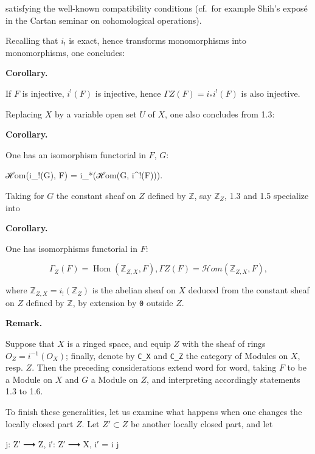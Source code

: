 \documentclass[
]{article}
\newenvironment{Shaded}{}{}
\newcommand{\NormalTok}[1]{#1}
\begin{document}
satisfying the well-known compatibility conditions (cf.~for example
Shih's exposé in the Cartan seminar on cohomological operations).

Recalling that \(i_{!}\) is exact, hence transforms monomorphisms into
monomorphisms, one concludes:

\textbf{Corollary.}

If \(F\) is injective, \(i^{!}(F)\) is injective, hence
\(\Gamma Z(F) = i_{*} i^{!}(F)\) is also injective.

Replacing \(X\) by a variable open set \(U\) of \(X\), one also
concludes from 1.3:

\textbf{Corollary.}

One has an isomorphism functorial in \(F\), \(G\):

\begin{Shaded}
\begin{Highlighting}[]
\NormalTok{ℋom(i\_!(G), F) = i\_*(ℋom(G, i\^{}!(F))).}
\end{Highlighting}
\end{Shaded}

Taking for \(G\) the constant sheaf on \(Z\) defined by \(\mathbb{Z}\),
say \(\mathbb{Z}_{Z}\), 1.3 and 1.5 specialize into

\textbf{Corollary.}

One has isomorphisms functorial in \(F\):

\[
\Gamma_{Z}(F) = \operatorname{Hom}(\mathbb{Z}_{Z,X}, F),
\Gamma Z(F)  = \mathcal{H}om(\mathbb{Z}_{Z,X}, F),
\]

where \(\mathbb{Z}_{Z,X} = i_{!}(\mathbb{Z}_{Z})\) is the abelian sheaf
on \(X\) deduced from the constant sheaf on \(Z\) defined by
\(\mathbb{Z}\), by extension by \texttt{0} outside \(Z\).

\textbf{Remark.}

Suppose that \(X\) is a ringed space, and equip \(Z\) with the sheaf of
rings \(O_{Z} = i^{-1}(O_{X})\); finally, denote by \texttt{C\_X} and
\texttt{C\_Z} the category of Modules on \(X\), resp. \(Z\). Then the
preceding considerations extend word for word, taking \(F\) to be a
Module on \(X\) and \(G\) a Module on \(Z\), and interpreting
accordingly statements 1.3 to 1.6.

To finish these generalities, let us examine what happens when one
changes the locally closed part \(Z\). Let \(Z' \subset Z\) be another
locally closed part, and let

\begin{Shaded}
\begin{Highlighting}[]
\NormalTok{j: Z′ ⟶ Z,   i′: Z′ ⟶ X,   i′ = i j}
\end{Highlighting}
\end{Shaded}
\end{document}
